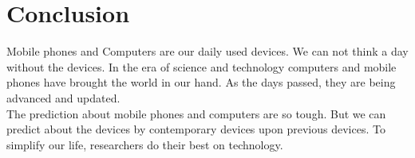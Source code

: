 \section{Conclusion}
Mobile phones and Computers are our daily used devices. We can not think a day without the devices. In the era of science and technology computers and mobile phones have brought the world in our hand. As the days passed, they are being advanced and updated.\\
The prediction about mobile phones and computers are so tough. But we can predict about the devices by contemporary devices upon previous devices. To simplify our life, researchers do their best on technology.   